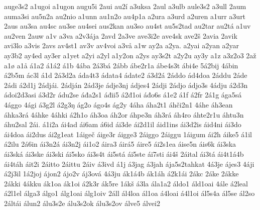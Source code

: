 {    auge3s2
    a1ugoi
    a1ugon
    augu5i
    2aui
    au2í
    a3uksa
    2aul
    a3ulb
    aule3s2
    a3ull
    2aum
    auma3si
    au5n2a
    au2nio
    a1unn
    au1n2o
    au4p1a
    a2ura
    a3urd
    a2uren
    a1urr
    a3urt
    2aus
    au3sa
    au4sc
    au3se
    au4sei
    aus2kan
    au3so
    au4st
    au5s2tad
    au2tar
    au2tá
    a1uv
    au2ven
    2auw
    a1v
    a3va
    a2v3ája
    2avd
    2a3ve
    ave3i2e
    ave4sk
    ave2š
    2avia
    2avik
    avi3lo
    a3vis
    2avs
    av4st1
    av3v
    av4voi
    a3vå
    a1w
    ay2a
    a2ya.
    a2yai
    a2yan
    a2yar
    ay3b2
    ay4ed
    ay3er
    a1yet
    a2yi
    a2yl
    a1y2on
    a2ys
    ay3s2t
    a2y2u
    ay3y
    a1z
    a3z2o3
    2až
    a1ø
    a1å
    á1a2
    á1á2
    á1b
    4ába
    2á3bá
    2ább
    ábe2r1a
    ábe4s3t
    ábi4e
    5á2bij
    4ábin
    á2b5m
    ác3l
    á1d
    2á3d2a
    áda4t3
    ádata4
    ádate2
    á3d2á
    2áddo
    ád4doa
    2áddu
    2áde
    2ádi
    á2d1j
    2ádjái.
    2ádján
    2ád3je
    ádje3nj
    ádjes4
    2ádji
    2ádjo
    ádjo3s
    4ádju
    á2d3n
    ádoi2d3asi
    á3d2r
    ádu2se
    áđa2s1
    áđii5
    á2đ1oi
    áđo6s
    á1e2
    á1f
    á2fr
    2á1g
    ága5sá
    4ággo
    4ági
    á3g2l
    á2g3ŋ
    ág2o
    ágo4s
    ág2y
    4áha
    áha2t1
    áhči2n1
    4áhe
    áh3ean
    áhka3rá
    4áhke
    4áhki
    á2h1o
    áh3oa
    áh2or
    áhpe3n
    áh3rá
    áh4ro
    áhte2r1u
    áhtu3n
    áhu2sal
    2ái.
    á1i2a
    ái4ad
    ái6am
    á6id
    ái3de
    ái2d1il
    áid1ins
    ái3d2is
    áid4ni
    ái3do
    ái4doa
    ái2dus
    ái2g1eat
    1áigeč
    áige3r
    áigge3
    2áiggo
    2áiggu
    1áigum
    ái2h
    áike5
    á1il
    á2ilu
    2á6in
    ái3n2á
    ái3n2j
    ái1o2
    áira3
    áirá5
    áire5
    ái2s1ea
    áise5n
    áis6k
    ái3ska
    ái3ská
    ái3ske
    ái3ski
    ái5sko
    ái3s4t
    ái5stá
    ái5ste
    ái7sti
    ái4š
    2áital
    ái3tá
    ái4t1á4b
    ái4táh
    áit2i
    2áitto
    2áittu
    2áiv
    á3ivd
    á1j
    á3jag
    á3jah
    ája5s2tahkat
    4á3je
    ájes3
    4áji
    á2j3il
    1á2joj
    ájon2
    ájo2v
    áj3ová
    4á3ju
    ák1á4b
    ák1áh
    á2k1ái
    2ákc
    2áke
    2ákke
    2ákki
    4ákku
    ák1oa
    ák1oi
    á2k3r
    ák5re
    1ákš
    á3la
    ála1a2
    áldo1
    áld1oai
    4ále
    á2leal
    á2l1el
    álga3
    álgo1
    álg1oai
    álg1oiv
    2áll
    ál4loa
    ál1oa
    á4loai
    á4l1oi
    ál5s4a
    ál5se
    ál2so
    2áltái
    álun2
    álu3s2e
    álu3s2ok
    álu3s2ov
    álve5
    álvei2
}
